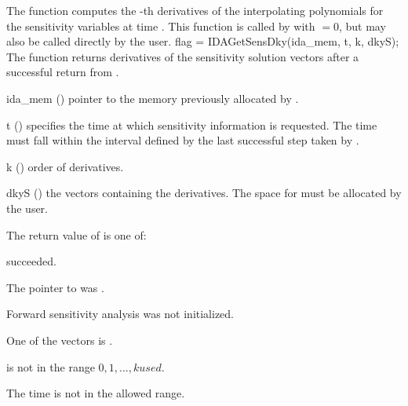 The function  computes the -th derivatives of the interpolating 
polynomials for the sensitivity variables at time .
This function is called by  with  $= 0$, but may also be called 
directly by the user.
{
  flag = IDAGetSensDky(ida\_mem, t, k, dkyS);
}
{
  The function  returns derivatives of the sensitivity solution 
  vectors after a successful return from .
}
{
  \begin{args}
  \item[ida\_mem] ()
    pointer to the memory previously allocated by .
  \item[t] ()
    specifies the time at which sensitivity information is 
    requested. The time  must fall within the interval defined by the last 
    successful step taken by {\idas}.
  \item[k] () order of derivatives.
  \item[dkyS] ()
    the vectors containing the derivatives. The space for  must be allocated by 
    the user. 
  \end{args}
}
{
  The return value  of  is one of:
  \begin{args}
  \item[\Id{IDA\_SUCCESS}] 
     succeeded.
  \item[\Id{IDA\_MEM\_NULL}] 
    The pointer to  was .
  \item[\Id{IDA\_NO\_SENS}] 
    Forward sensitivity analysis was not initialized.
  \item[\Id{IDA\_BAD\_DKY}] 
    One of the vectors  is .
  \item[\Id{IDA\_BAD\_K}]
     is not in the range $0, 1, ..., kused$.
  \item[\Id{IDA\_BAD\_T}] 
    The time  is not in the allowed range.
  \end{args}
}
